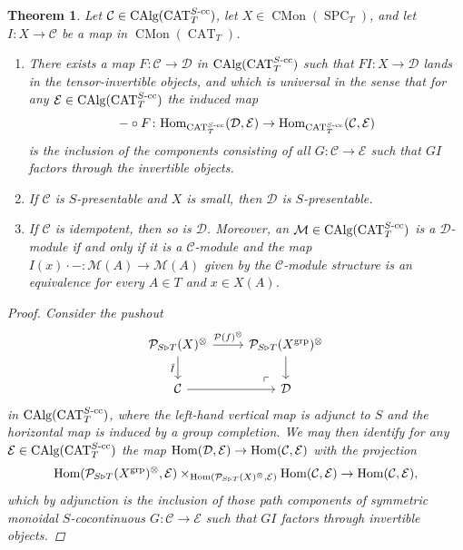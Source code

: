 \documentclass[reqno]{memo-l}
\theoremstyle{mythm}
\newtheorem{thm}{Theorem}[section]
\theoremstyle{definition}
\numberwithin{equation}{section}
\newcommand{\Cc}{{\mathcal{C}}}
\newcommand{\Dd}{{\mathcal{D}}}
\newcommand{\Ee}{{\mathcal{E}}}
\newcommand{\Mm}{{\mathcal{M}}}
\DeclareMathOperator{\SPC}{SPC}
\DeclareMathOperator{\CAT}{CAT}
\renewcommand{\hom}{\textup{hom}}
\DeclareMathOperator{\CMon}{CMon}
\renewcommand{\hom}{{\textup{Hom}}}
\DeclareMathOperator{\CAlg}{\textup{CAlg}}
\newcommand{\grp}{\textup{grp}}
\begin{document}
\begin{thm}\label{thm:sym-mon-localization-for-modes}
    Let $\Cc\in\CAlg(\CAT_T^\textup{$S$-cc})$, let $X\in\CMon(\SPC_T)$, and let $I\colon X\to\Cc$ be a map in $\CMon(\CAT_T)$. 
    
    \begin{enumerate}
        \item There exists a map $F\colon\Cc\to\Dd$ in $\CAlg(\CAT^\textup{$S$-cc}_T)$ such that $FI\colon X\to\Dd$ lands in the tensor-invertible objects, and which is universal in the sense that for any $\Ee\in\CAlg(\CAT_T^\textup{$S$-cc})$ the induced map
        \[
            -\circ F\colon\hom_{\CAT_T^\textup{$S$-cc}}(\Dd,\Ee)\to\hom_{\CAT_T^\textup{$S$-cc}}(\Cc,\Ee)
        \]
        is the inclusion of the components consisting of all $G\colon\Cc\to\Ee$ such that $GI$ factors through the invertible objects.
        \item If $\Cc$ is $S$-presentable and $X$ is small, then $\Dd$ is $S$-presentable.
        \item If $\Cc$ is idempotent, then so is $\Dd$. Moreover, an $\Mm\in\CAlg(\CAT_T^\textup{$S$-cc})$ is a $\Dd$-module if and only if it is a $\Cc$-module and the map $I(x)\cdot-\colon\Mm(A)\to\Mm(A)$ given by the $\Cc$-module structure is an equivalence for every $A\in T$ and $x\in X(A)$.
    \end{enumerate}
    \begin{proof} Consider the pushout
        \begin{equation}\label{diag:pushout-inversion}
            \begin{tikzcd}
                \mathcal P_{S\triangleright T}(X)^{\otimes}\arrow[r,"\mathcal P(f)^{\otimes}"]\arrow[d,"\tilde I"']\arrow[dr,phantom,"\ulcorner"{very near end}] & \mathcal P_{S\triangleright T}(X^{\grp})^{\otimes}\arrow[d]\\
                \Cc\arrow[r] & \Dd
            \end{tikzcd}
        \end{equation}
        in $\CAlg(\CAT_T^\textup{$S$-cc})$, where the left-hand vertical map is adjunct to $S$ and the horizontal map is induced by a group completion. We may then identify for any $\Ee\in\CAlg(\CAT_T^\textup{$S$-cc})$ the map $\hom(\Dd,\Ee)\to\hom(\Cc,\Ee)$ with the projection 
        \[
            \hom(\mathcal P_{S\triangleright T}(X^{\grp})^{\otimes},\Ee)\times_{\hom(\mathcal P_{S\triangleright T}(X)^{\otimes},\Ee)}\hom(\Cc,\Ee)\to\hom(\Cc,\Ee),
        \]
        which by adjunction is the inclusion of those path components of symmetric monoidal $S$-cocontinuous $G\colon\Cc\to\Ee$ such that $GI$ factors through invertible objects.


\end{proof}
\end{thm}
\end{document}
